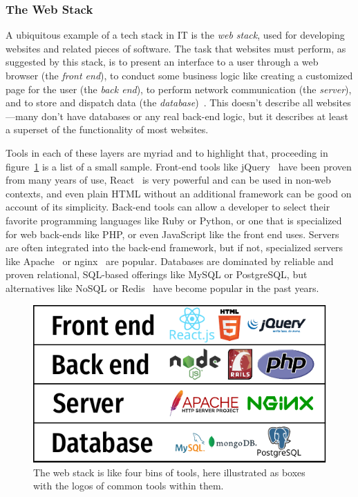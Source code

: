 \documentclass[english,12pt,a4paper,pdftex,eng,utf8]{aaltothesis}
\begin{document}
\subsubsection{The Web Stack}

A ubiquitous example of a tech stack in IT is the \textit{web stack}, used for developing websites and related pieces of software. The task that websites must perform, as suggested by this stack, is to present an interface to a user through a web browser (the \textit{front end}), to conduct some business logic like creating a customized page for the user (the \textit{back end}), to perform network communication (the \textit{server}), and to store and dispatch data (the \textit{database})~\cite{PranamStack2017}. This doesn't describe all websites---many don't have databases or any real back-end logic, but it describes at least a superset of the functionality of most websites.

Tools in each of these layers are myriad and to highlight that, proceeding in figure~\ref{fig:web_stack} is a list of a small sample. Front-end tools like jQuery~\cite{jQuery} have been proven from many years of use, React~\cite{React} is very powerful and can be used in non-web contexts, and even plain HTML without an additional framework can be good on account of its simplicity. Back-end tools can allow a developer to select their favorite programming languages like Ruby or Python, or one that is specialized for web back-ends like PHP, or even JavaScript like the front end uses. Servers are often integrated into the back-end framework, but if not, specialized servers like Apache~\cite{ApacheServer} or nginx~\cite{nginx} are popular. Databases are dominated by reliable and proven relational, SQL-based offerings like MySQL or PostgreSQL, but alternatives like NoSQL or Redis~\cite{redis} have become popular in the past years.

\begin{figure}[h]
  \centering
  \includegraphics[width=\textwidth]{assets/web_stack}
  \caption{The web stack is like four bins of tools, here illustrated as boxes with the logos of common tools within them.}\label{fig:web_stack}
\end{figure}
\end{document}
